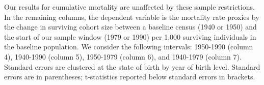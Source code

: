 \documentclass[12pt]{article}
\begin{document}
\begin{landscape}
\begin{table}[!ht]
\begin{adjustbox}{width=1.0\textwidth}
\begin{threeparttable}
{                Our results for cumulative mortality are unaffected by these sample restrictions. 
                In the remaining columns, the dependent variable is the mortality rate proxies by the change in surviving cohort size between a baseline census (1940 or 1950) and the start of our sample window (1979 or 1990) per 1,000 surviving individuals in the baseline population.
                We consider the following intervals: 1950-1990 (column 4), 1940-1990 (column 5), 1950-1979 (column 6), and 1940-1979 (column 7).
                Standard errors are clustered at the state of birth by year of birth level. 
                Standard errors are in parentheses; t-statistics reported below standard errors in brackets.
              }
          \end{threeparttable}
         \end{adjustbox}
    \end{table}
\end{landscape}

\end{document}
